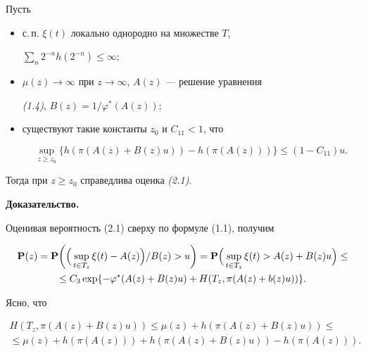  


\begin{thms} Пусть 


\begin{itemize} 


\item[а)] с.\,п. $\xi(t)$ локально однородно на множестве $T$, 


$\sum\limits_n2^{-n}h(2^{-n})\le\infty;$ 


\item[б)] $\mu(z)\to\infty$ при $z\to\infty$, $A(z)$ --- решение уравнения 


{\em (1.4)}, $B(z)=1/\varphi^*(A(z));$ 


\item[в)] существуют такие константы $z_0$ и $C_{11}<1$, что 


$$ 


\sup_{z\ge z_0}\{h(\pi(A(z)+B(z)u))-h(\pi(A(z)))\} 


\le(1-C_{11})u. 


$$ 


\end{itemize} 


Тогда при $z\ge z_0$ справедлива оценка {\em (2.1)}. 


\end{thms} 


 


{\bf Доказательство.}


Оценивая вероятность (2.1) сверху по формуле (1.1), получим 


\begin{gather*} 


{\bold P}(z)={\bold P} 


\biggl(\Bigl(\,\sup_{t\in T_z}\xi(t)-A(z)\Bigr)/B(z)>u\biggr)= 


{\bold P}\Bigl(\,\sup_{t\in T_z}\xi(t)>A(z)+B(z)u\Bigr)\le\\ 


\le C_3\exp\{-\varphi^*(A(z)+B(z)u)+H(T_z,\pi(A(z)+b(z)u))\}. 


\end{gather*} 


Ясно, что 


\begin{gather*} 


H(T_z,\pi(A(z)+B(z)u))\le\mu(z)+h(\pi(A(z)+B(z)u))\le\\ 


\le\mu(z)+h(\pi(A(z)))+h(\pi(A(z)+B(z)u))-h(\pi(A(z))). 


\end{gather*} 


